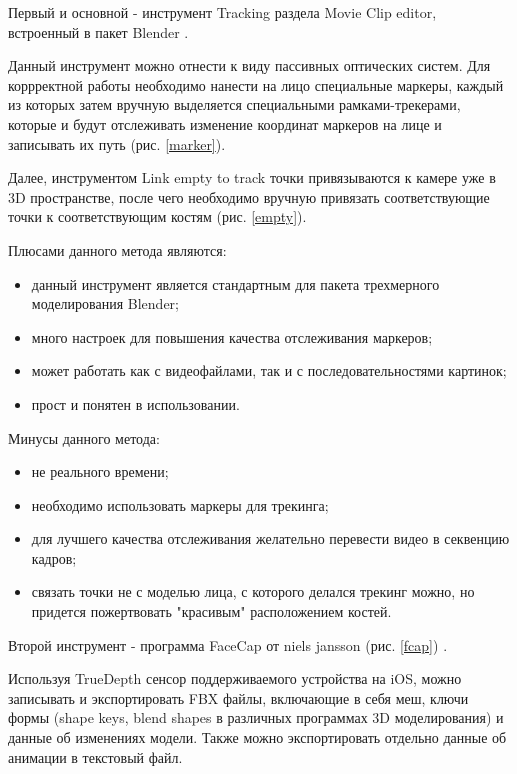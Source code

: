 Первый и основной - инструмент Tracking раздела Movie Clip editor, встроенный в пакет Blender \cite{cgmatter-ytb}.

Данный инструмент можно отнести к виду пассивных оптических систем. Для коррректной работы необходимо нанести на лицо специальные маркеры, каждый из которых затем вручную выделяется специальными рамками-трекерами, которые и будут отслеживать изменение координат маркеров на лице и записывать их путь (рис. \ref{marker}).


Далее, инструментом Link empty to track точки привязываются к камере уже в 3D пространстве, после чего необходимо вручную привязать соответствующие точки к соответствующим костям (рис. \ref{empty}).

  
 \clearpage
 
  
Плюсами данного метода являются:
\begin{itemize}
	\item данный инструмент является стандартным для пакета трехмерного моделирования Blender;
	\item много настроек для повышения качества отслеживания маркеров;
	\item может работать как с видеофайлами, так и с последовательностями картинок;
	\item прост и понятен в использовании.
\end{itemize}
Минусы данного метода:
\begin{itemize}
	\item не реального времени;
	\item необходимо использовать маркеры для трекинга;
	\item для лучшего качества отслеживания желательно перевести видео в секвенцию кадров;
	\item связать точки не с моделью лица, с которого делался трекинг можно, но придется пожертвовать "красивым" расположением костей.
\end{itemize}

Второй инструмент - программа FaceCap от niels jansson (рис. \ref{fcap}) \cite{facecap}. 


Используя TrueDepth сенсор поддерживаемого устройства на iOS, можно записывать и экспортировать FBX файлы, включающие в себя меш, ключи формы (shape keys, blend shapes в различных программах 3D моделирования) и данные об изменениях модели. Также можно экспортировать отдельно данные об анимации в текстовый файл.

